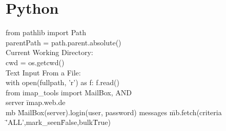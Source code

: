 \chapter{Python}\label{chap:Python}
from pathlib import Path\\
parentPath = path.parent.absolute()\\
Current Working Directory:\\
cwd = os.getcwd()\\
Text Input From a File:\\
with open(fullpath, 'r') as f:
f.read()\\

from imap_tools import MailBox, AND\\
server \= imap.web.de\\
mb \= MailBox(server).login(user, password)
messages \= mb.fetch(criteria \= 'ALL',mark_seen\=False,bulk\=True)